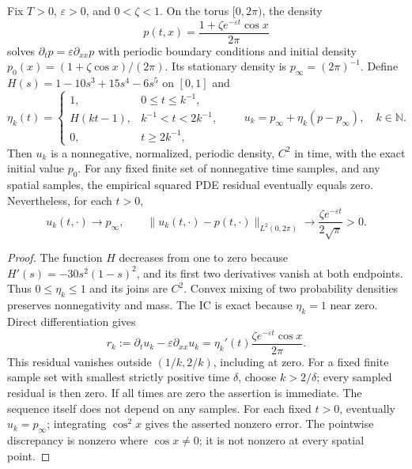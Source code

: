 \documentclass[12pt,a4paper,oneside]{book}
\begin{document}
\begin{proposition}
\label{prop:neural-pinn-failure}
\label{src:p2main}
Fix $T>0$, $\varepsilon>0$, and $0<\zeta<1$. On the torus $[0,2\pi)$, the density
\begin{equation*}
 p(t,x)=\frac{1+\zeta e^{-\varepsilon t}\cos x}{2\pi}
\end{equation*}
solves $\partial_t p=\varepsilon\partial_{xx}p$ with periodic boundary conditions and initial density
$p_0(x)=(1+\zeta\cos x)/(2\pi)$. Its stationary density is $p_\infty=(2\pi)^{-1}$.
Define $H(s)=1-10s^3+15s^4-6s^5$ on $[0,1]$ and
\begin{equation*}
 \eta_k(t)=
 \begin{cases}
 1,&0\le t\le k^{-1},\\
 H(kt-1),&k^{-1}<t<2k^{-1},\\
 0,&t\ge2k^{-1},
 \end{cases}
 \qquad u_k=p_\infty+\eta_k(p-p_\infty),\quad k\in\mathbb N.
\end{equation*}
Then $u_k$ is a nonnegative, normalized, periodic density, $C^2$ in time, with the exact initial value $p_0$.
For any fixed finite set of nonnegative time samples, and any spatial samples, the empirical squared PDE residual
eventually equals zero. Nevertheless, for each $t>0$,
\begin{equation*}
 u_k(t,\cdot)\longrightarrow p_\infty,\qquad
 \|u_k(t,\cdot)-p(t,\cdot)\|_{L^2(0,2\pi)}
 \longrightarrow \frac{\zeta e^{-\varepsilon t}}{2\sqrt\pi}>0.
\end{equation*}
\end{proposition}
\begin{proof}
The function $H$ decreases from one to zero because $H'(s)=-30s^2(1-s)^2$, and its first two derivatives vanish
at both endpoints. Thus $0\le\eta_k\le1$ and its joins are $C^2$. Convex mixing of two probability densities
preserves nonnegativity and mass. The IC is exact because $\eta_k=1$ near zero. Direct differentiation gives
\begin{equation}
 r_k:=\partial_tu_k-\varepsilon\partial_{xx}u_k
 =\eta_k'(t)\frac{\zeta e^{-\varepsilon t}\cos x}{2\pi}.
 \label{eq:neural-cutoff-residual}
\end{equation}
This residual vanishes outside $(1/k,2/k)$, including at zero. For a fixed finite sample set with smallest strictly
positive time $\delta$, choose $k>2/\delta$; every sampled residual is then zero. If all times are zero the assertion
is immediate. The sequence itself does not depend on any samples. For each fixed $t>0$, eventually $u_k=p_\infty$;
integrating $\cos^2x$ gives the asserted nonzero error. The pointwise discrepancy is nonzero where $\cos x\ne0$;
it is not nonzero at every spatial point.
\end{proof}
\end{document}
